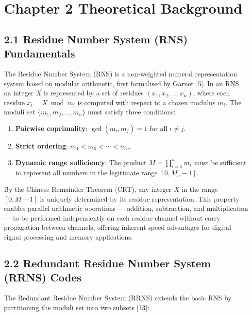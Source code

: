 \section{Chapter 2 Theoretical
Background}\label{chapter-2-theoretical-background}

\subsection{2.1 Residue Number System (RNS)
Fundamentals}\label{residue-number-system-rns-fundamentals}

The Residue Number System (RNS) is a non-weighted numeral representation
system based on modular arithmetic, first formalised by Garner {[}5{]}.
In an RNS, an integer \(X\) is represented by a set of residues
\((x_1, x_2, \ldots, x_n)\), where each residue \(x_i = X \bmod m_i\) is
computed with respect to a chosen modulus \(m_i\). The moduli set
\(\{m_1, m_2, \ldots, m_n\}\) must satisfy three conditions:

\begin{enumerate}
\def\labelenumi{\arabic{enumi}.}
\tightlist
\item
  \textbf{Pairwise coprimality}: \(\gcd(m_i, m_j) = 1\) for all
  \(i \neq j\).
\item
  \textbf{Strict ordering}: \(m_1 < m_2 < \cdots < m_n\).
\item
  \textbf{Dynamic range sufficiency}: The product
  \(M = \prod_{i=1}^{n} m_i\) must be sufficient to represent all
  numbers in the legitimate range \([0, M_a - 1]\).
\end{enumerate}

By the Chinese Remainder Theorem (CRT), any integer \(X\) in the range
\([0, M-1]\) is uniquely determined by its residue representation. This
property enables parallel arithmetic operations --- addition,
subtraction, and multiplication --- to be performed independently on
each residue channel without carry propagation between channels,
offering inherent speed advantages for digital signal processing and
memory applications.

\subsection{2.2 Redundant Residue Number System (RRNS)
Codes}\label{redundant-residue-number-system-rrns-codes}

The Redundant Residue Number System (RRNS) extends the basic RNS by
partitioning the moduli set into two subsets {[}13{]}:

